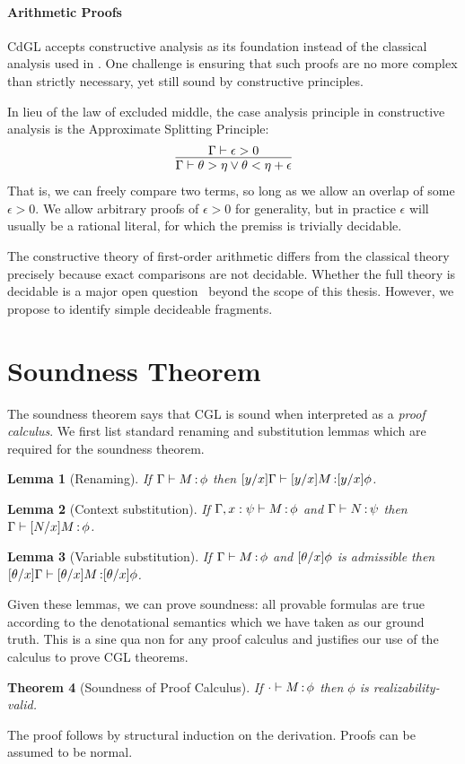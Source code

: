 \documentclass[12pt]{cmuthesis}
\newtheorem{theorem}{Theorem}
\newtheorem{lemma}[theorem]{Lemma}
\theoremstyle{definition}
\theoremstyle{remark}
\newcommand{\CGL}{\textsf{CGL}\xspace}
\newcommand{\CdGL}{\textsf{CdGL}\xspace}
\newcommand{\G}{\Gamma}
\begin{document}
\paragraph*{Arithmetic Proofs}
\label{sec:arith-proof}
\CdGL accepts constructive analysis as its foundation instead of the classical analysis used in \dGL.
One challenge is ensuring that such proofs are no more complex than strictly necessary, yet still sound by constructive principles.

In lieu of the law of excluded middle, the case analysis principle in constructive analysis is the Approximate Splitting Principle:
\[\infer{\Gamma \vdash \theta > \eta \lor \theta < \eta + \epsilon}{\Gamma \vdash \epsilon > 0}\]
That is, we can freely compare two terms, so long as we allow an overlap of some $\epsilon > 0$.
We allow arbitrary proofs of $\epsilon > 0$ for generality, but in practice $\epsilon$ will usually be a rational literal, for which the premiss is trivially decidable.

The constructive theory of first-order arithmetic differs from the classical theory precisely because exact comparisons are not decidable.
Whether the full theory is decidable is a major open question~\cite{constructiveRealAlgebra} beyond the scope of this thesis.
However, we propose to identify simple decideable fragments.

\section{Soundness Theorem}
The soundness theorem says that \CGL is sound when interpreted as a \emph{proof calculus}.
We first list standard renaming and substitution lemmas which are required for the soundness theorem.
\begin{lemma}[Renaming]
  If $\proves{\G}{M}{\phi}$ then $\proves{\esub{\G}{x}{y}}{\esub{M}{x}{y}}{\esub{\phi}{x}{y}}$.
\end{lemma}
\begin{lemma}[Context substitution]
  If $\proves{\G,x:\psi}{M}{\phi}$ and $\proves{\G}{N}{\psi}$ then $\proves{\G}{\esub{M}{x}{N}}{\phi}$.
\end{lemma}
\begin{lemma}[Variable substitution]
  If $\proves{\G}{M}{\phi}$ and $[{\theta}/{x}]{\phi}$ is admissible then $\proves{\esub{\G}{x}{\theta}}{\esub{M}{x}{\theta}}{\esub{\phi}{x}{\theta}}$.
\end{lemma}
Given these lemmas, we can prove soundness: all provable formulas are true according to the denotational semantics which we have taken as our ground truth.
This is a sine qua non for any proof calculus and justifies our use of the calculus to prove \CGL theorems.
\begin{theorem}[Soundness of Proof Calculus]
  If $\cdot\allowbreak\vdash M \allowbreak \mathop{:} \phi$ then $\phi$ is realizability-valid.
\end{theorem}
The proof follows by structural induction on the derivation.
Proofs can be assumed to be normal.
\end{document}
